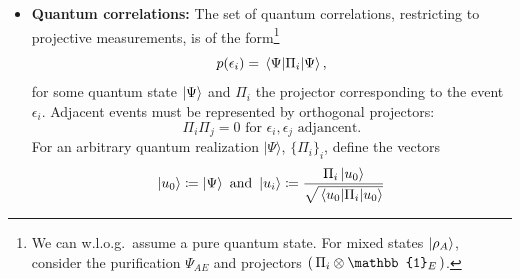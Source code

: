 \begin{itemize}
    \item \textbf{Quantum correlations:}
    The set of quantum correlations, restricting to projective measurements, is of the form\footnote{We can w.l.o.g.\ assume a pure quantum state. For mixed states $\ket{\rho_A}$, consider the purification $\Psi_{AE}$ and projectors $(\thinspace\Pi_i\otimes\mathbb{1}_E\thinspace)$.} \begin{equation*}
    p(\epsilon_i)=\expval{\Pi_i}{\Psi},
    \end{equation*}
    for some quantum state $\ket{\Psi}$ and $\Pi_{i}$ the projector corresponding to the event $\epsilon_i$. Adjacent events must be represented by orthogonal projectors:
    \begin{equation*}
        \Pi_{i}\Pi_{j} = 0 \text{ for } \epsilon_i, \epsilon_j \text{ adjancent}.
    \end{equation*}
    For an arbitrary quantum realization $\vert \Psi\rangle$, $\{\Pi_{i}\}_i$, define the vectors
    \[\ket{u_0} \coloneqq \ket{\Psi}\text{ and }\ket{u_i} \coloneqq \frac{\Pi_{i} \ket{u_0}}{\sqrt{\expval{\Pi_i}{u_0}}} \]
    

\end{itemize}
